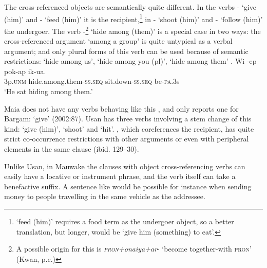 The cross-referenced objects are semantically quite different. In the verbs - `give (him)' and - `feed (him)' it is the recipient,\footnote{ `feed (him)' requires a food term as the undergoer object, so a better translation, but longer, would be `give him (something) to eat'.} in - `shoot (him)' and - `follow (him)' the undergoer. The verb -\footnote{A possible origin for this is \textit{\textsc{pron}+onaiya+ar}- `become together-with \textsc{pron}' (Kwan, p.c.)} `hide among (them)' is a special case in two ways: the cross-referenced argument `among a group' is quite untypical as a verbal argument; and only plural forms of this verb can be used because of semantic restrictions:  `hide among us',  `hide among you (pl)',  `hide among them' .
%
%
\ea%
\label{ex:3:x337}
\gll Wi -ep pok-ap ik-ua. \\
3p.\textsc{unm} hide.among.them-\textsc{ss}.\textsc{seq} sit.down-\textsc{ss}.\textsc{seq} be-\textsc{pa}.3s \\
\glt`He sat hiding among them.'
\z

Maia does not have any verbs behaving like this \citep{Hardin2002}, and \citeauthor{Hepner2002} only reports one for Bargam:  `give' (2002:87). Usan has three verbs involving a stem change of this kind:  `give (him)',  `shoot' and  `hit'\citep[44]{Reesink1987}. , which coreferences the recipient, has quite strict co-occurrence restrictions with other arguments or even with peripheral elements in the same clause (ibid. 129--30). 



Unlike Usan, in Mauwake the clauses with object cross-referencing verbs can easily have a locative or instrument phrase, and the verb itself can take a benefactive suffix. A sentence like  would be possible for instance when sending money to people travelling in the same vehicle as the addressee. 

